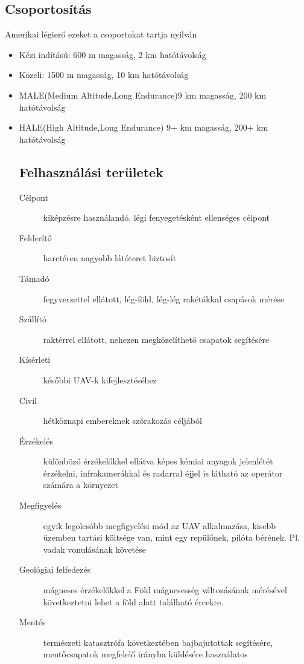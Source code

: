 \documentclass[12pt]{article}
\begin{document}
\subsection{Csoportosítás}

Amerikai légier\H{o} ezeket a csoportokat tartja nyilván
\begin{itemize}
\item Kézi indítású: 600 m magasság, 2 km hatótávolság
\item Közeli: 1500 m magasság, 10 km hatótávolság
\item MALE(Medium Altitude,Long Endurance)9 km magasság, 200 km hatótávolság
\item HALE(High Altitude,Long Endurance) 9+ km magasság, 200+ km hatótávolság


\subsection{Felhasználási területek}

\begin{description}
\item[Célpont] kiképzésre használandó, légi fenyegetésként ellenséges célpont
\item[Felderít\H{o}] harctéren nagyobb látóteret biztosít
\item[Támadó] fegyverzettel ellátott, lég-föld, lég-lég rakétákkal csapások mérése
\item[Szállító] raktérrel ellátott, nehezen megközelíthet\H{o} csapatok segítésére
\item[Kísérleti] kés\H{o}bbi UAV-k kifejlesztéséhez
\item[Civil] hétköznapi embereknek szórakozás céljából


\item[Érzékelés] különböz\H{o} érzékel\H{o}kkel ellátva képes kémiai anyagok jelenlétét érzékelni, infrakamerákkal és radarral éjjel is látható az operátor számára a környezet

\item[Megfigyelés] egyik legolcsóbb megfigyelési mód az UAV alkalmazása, kisebb üzemben tartási költsége van, mint egy repül\H{o}nek, pilóta bérének. Pl. vadak vonulásának követése

\item[Geológiai felfedezés] mágneses érzékel\H{o}kkel a Föld mágnesesség változásának mérésével következtetni lehet a föld alatt található ércekre.

\item[Mentés] természeti katasztrófa következtében bajbajutottak segítésére, ment\H{o}csapatok megfelel\H{o} irányba küldésére használatos


\end{description}
\end{itemize}
\end{document}
